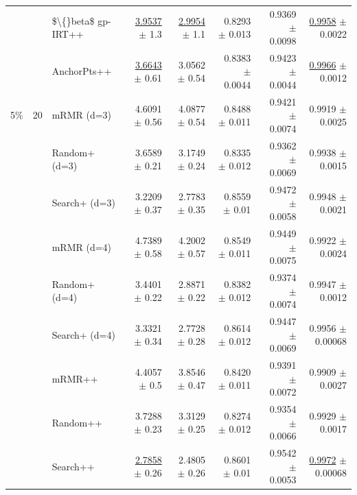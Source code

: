 \begin{longtable}{llp{}rrrrr}
 &  & \$\textbackslash\{\}beta\$ gp-IRT++ & \underline{3.9537} {\scriptsize $\pm$ 1.3} & \underline{2.9954} {\scriptsize $\pm$ 1.1} & 0.8293 {\scriptsize $\pm$ 0.013} & 0.9369 {\scriptsize $\pm$ 0.0098} & \underline{0.9958} {\scriptsize $\pm$ 0.0022} \\
 &  & AnchorPts++ & \underline{3.6643} {\scriptsize $\pm$ 0.61} & 3.0562 {\scriptsize $\pm$ 0.54} & 0.8383 {\scriptsize $\pm$ 0.0044} & 0.9423 {\scriptsize $\pm$ 0.0044} & \underline{0.9966} {\scriptsize $\pm$ 0.0012} \\
\midrule
5\% & 20 & mRMR (d=3) & 4.6091 {\scriptsize $\pm$ 0.56} & 4.0877 {\scriptsize $\pm$ 0.54} & 0.8488 {\scriptsize $\pm$ 0.011} & 0.9421 {\scriptsize $\pm$ 0.0074} & 0.9919 {\scriptsize $\pm$ 0.0025} \\
 &  & Random+ (d=3) & 3.6589 {\scriptsize $\pm$ 0.21} & 3.1749 {\scriptsize $\pm$ 0.24} & 0.8335 {\scriptsize $\pm$ 0.012} & 0.9362 {\scriptsize $\pm$ 0.0069} & 0.9938 {\scriptsize $\pm$ 0.0015} \\
 &  & Search+ (d=3) & 3.2209 {\scriptsize $\pm$ 0.37} & 2.7783 {\scriptsize $\pm$ 0.35} & 0.8559 {\scriptsize $\pm$ 0.01} & 0.9472 {\scriptsize $\pm$ 0.0058} & 0.9948 {\scriptsize $\pm$ 0.0021} \\
 &  & mRMR (d=4) & 4.7389 {\scriptsize $\pm$ 0.58} & 4.2002 {\scriptsize $\pm$ 0.57} & 0.8549 {\scriptsize $\pm$ 0.011} & 0.9449 {\scriptsize $\pm$ 0.0075} & 0.9922 {\scriptsize $\pm$ 0.0024} \\
 &  & Random+ (d=4) & 3.4401 {\scriptsize $\pm$ 0.22} & 2.8871 {\scriptsize $\pm$ 0.22} & 0.8382 {\scriptsize $\pm$ 0.012} & 0.9374 {\scriptsize $\pm$ 0.0074} & 0.9947 {\scriptsize $\pm$ 0.0012} \\
 &  & Search+ (d=4) & 3.3321 {\scriptsize $\pm$ 0.34} & 2.7728 {\scriptsize $\pm$ 0.28} & 0.8614 {\scriptsize $\pm$ 0.012} & 0.9447 {\scriptsize $\pm$ 0.0069} & 0.9956 {\scriptsize $\pm$ 0.00068} \\
 &  & mRMR++ & 4.4057 {\scriptsize $\pm$ 0.5} & 3.8546 {\scriptsize $\pm$ 0.47} & 0.8420 {\scriptsize $\pm$ 0.011} & 0.9391 {\scriptsize $\pm$ 0.0072} & 0.9909 {\scriptsize $\pm$ 0.0027} \\
 &  & Random++ & 3.7288 {\scriptsize $\pm$ 0.23} & 3.3129 {\scriptsize $\pm$ 0.25} & 0.8274 {\scriptsize $\pm$ 0.012} & 0.9354 {\scriptsize $\pm$ 0.0066} & 0.9929 {\scriptsize $\pm$ 0.0017} \\
 &  & Search++ & \underline{2.7858} {\scriptsize $\pm$ 0.26} & 2.4805 {\scriptsize $\pm$ 0.26} & 0.8601 {\scriptsize $\pm$ 0.01} & 0.9542 {\scriptsize $\pm$ 0.0053} & \underline{0.9972} {\scriptsize $\pm$ 0.00068} \\

\end{longtable}
